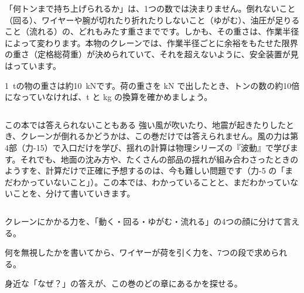 「何トンまで持ち上げられるか」は、1つの数では決まりません。倒れないこと（回る）、ワイヤーや腕が切れたり折れたりしないこと（ゆがむ）、油圧が足りること（流れる）の、どれもみたす重さまでです。しかも、その重さは、作業半径によって変わります。本物のクレーンでは、作業半径ごとに余裕をもたせた限界の重さ（定格総荷重）が決められていて、それを超えないように、安全装置が見はっています。
\begin{phketa}[クレーンの力]
\qty{1}{t}の物の重さは約\qty{10}{kN}です。荷の重さを kN で出したとき、トンの数の約10倍になっていなければ、t と kg の換算を確かめましょう。
\end{phketa}

\begin{column}{この本では答えられないこともある}
強い風が吹いたり、地震が起きたりしたとき、クレーンが倒れるかどうかは、この巻だけでは答えられません。風の力は第4部（力-15）で入口だけを学び、揺れの計算は物理シリーズの『波動』で学びます。それでも、地面の沈み方や、たくさんの部品の揺れが組み合わさったときのようすを、計算だけで正確に予想するのは、今も難しい問題です（力-5 の「まだわかっていないこと」）。この本では、わかっていることと、まだわかっていないことを、分けて書いていきます。
\end{column}

\begin{kotoba}\small
{}
\end{kotoba}

\begin{furikaeri}
\begin{checklist}
\item クレーンにかかる力を、「動く・回る・ゆがむ・流れる」の4つの顔に分けて言える。
\item 何を無視したかを書いてから、ワイヤーが荷を引く力を、7つの段で求められる。
\item 身近な「なぜ？」の答えが、この巻のどの章にあるかを探せる。
\end{checklist}
\end{furikaeri}
